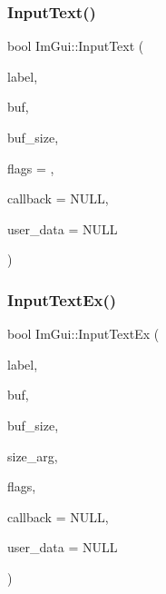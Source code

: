 \mbox{\label{namespace_im_gui_af2faa757ec3f5e6379f15b0acfac48f7}} 
\subsubsection{\texorpdfstring{Input\+Text()}{InputText()}}
{\footnotesize\ttfamily bool Im\+Gui\+::\+Input\+Text (\begin{DoxyParamCaption}\item[{const char $\ast$}]{label,  }\item[{char $\ast$}]{buf,  }\item[{size\+\_\+t}]{buf\+\_\+size,  }\item[{\mbox{\hyperlink{imgui_8h_a7d2c6153a6b9b5d3178ce82434ac9fb8}{Im\+Gui\+Input\+Text\+Flags}}}]{flags = {},  }\item[{\mbox{\hyperlink{imgui_8h_ae9254e6ad76a9bc7abc20929e07b29c5}{Im\+Gui\+Text\+Edit\+Callback}}}]{callback = {\ttfamily NULL},  }\item[{void $\ast$}]{user\+\_\+data = {\ttfamily NULL} }\end{DoxyParamCaption})}

\mbox{\label{namespace_im_gui_a4a62260abe773d4e193db94cdfdc41bf}} 
\subsubsection{\texorpdfstring{Input\+Text\+Ex()}{InputTextEx()}}
{\footnotesize\ttfamily bool Im\+Gui\+::\+Input\+Text\+Ex (\begin{DoxyParamCaption}\item[{const char $\ast$}]{label,  }\item[{char $\ast$}]{buf,  }\item[{int}]{buf\+\_\+size,  }\item[{const \mbox{\hyperlink{struct_im_vec2}{Im\+Vec2}} \&}]{size\+\_\+arg,  }\item[{\mbox{\hyperlink{imgui_8h_a7d2c6153a6b9b5d3178ce82434ac9fb8}{Im\+Gui\+Input\+Text\+Flags}}}]{flags,  }\item[{\mbox{\hyperlink{imgui_8h_ae9254e6ad76a9bc7abc20929e07b29c5}{Im\+Gui\+Text\+Edit\+Callback}}}]{callback = {\ttfamily NULL},  }\item[{void $\ast$}]{user\+\_\+data = {\ttfamily NULL} }\end{DoxyParamCaption})}

